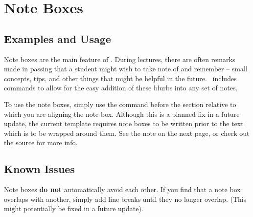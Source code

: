 \documentclass{ClassTeX}
\begin{document}
	\section{Note Boxes}
	
	\subsection{Examples and Usage}
		
	Note boxes are the main feature of \ClassTeX.  During lectures, there are often remarks made in passing that a student might wish to take note of and remember -- small concepts, tips, and other things that might be helpful in the future.  \ClassTeX\ includes commands to allow for the easy addition of these blurbs into any set of notes.\\
	
	To use the note boxes, simply use the command before the section relative to which you are aligning the note box.  Although this is a planned fix in a future update, the current template requires note boxes to be written prior to the text which is to be wrapped around them.  See the note on the next page, or check out the source for more info.\\
	
	
	\subsection{Known Issues}
	
	Note boxes \textbf{do not} automatically avoid each other.  If you find that a note box overlaps with another, simply add line breaks until they no longer overlap.  (This might potentially be fixed in a future update).
	
\end{document}
